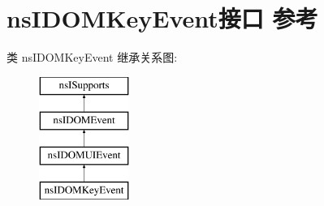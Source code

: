 \hypertarget{interfacens_i_d_o_m_key_event}{}\section{ns\+I\+D\+O\+M\+Key\+Event接口 参考}
\label{interfacens_i_d_o_m_key_event}
类 ns\+I\+D\+O\+M\+Key\+Event 继承关系图\+:\begin{figure}[H]
\begin{center}
\leavevmode
\includegraphics[height=4.000000cm]{interfacens_i_d_o_m_key_event}
\end{center}
\end{figure}
